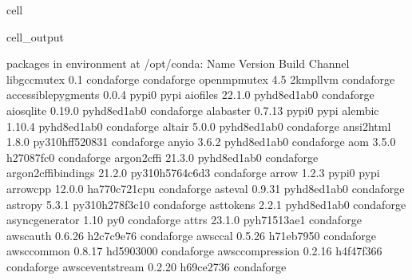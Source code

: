 \documentclass[letterpaper,table,10pt,english]{jupyterBook}
\begin{document}
\begin{sphinxuseclass}{cell}
\begin{sphinxVerbatimOutput}
\begin{sphinxuseclass}{cell_output}
\begin{sphinxVerbatim}[commandchars=\\\{\}]
\PYGZsh{} packages in environment at /opt/conda:
\PYGZsh{}
\PYGZsh{} Name                    Version                   Build  Channel
\PYGZus{}libgcc\PYGZus{}mutex             0.1                 conda\PYGZus{}forge    conda\PYGZhy{}forge
\PYGZus{}openmp\PYGZus{}mutex             4.5                  2\PYGZus{}kmp\PYGZus{}llvm    conda\PYGZhy{}forge
accessible\PYGZhy{}pygments       0.0.4                    pypi\PYGZus{}0    pypi
aiofiles                  22.1.0             pyhd8ed1ab\PYGZus{}0    conda\PYGZhy{}forge
aiosqlite                 0.19.0             pyhd8ed1ab\PYGZus{}0    conda\PYGZhy{}forge
alabaster                 0.7.13                   pypi\PYGZus{}0    pypi
alembic                   1.10.4             pyhd8ed1ab\PYGZus{}0    conda\PYGZhy{}forge
altair                    5.0.0              pyhd8ed1ab\PYGZus{}0    conda\PYGZhy{}forge
ansi2html                 1.8.0           py310hff52083\PYGZus{}1    conda\PYGZhy{}forge
anyio                     3.6.2              pyhd8ed1ab\PYGZus{}0    conda\PYGZhy{}forge
aom                       3.5.0                h27087fc\PYGZus{}0    conda\PYGZhy{}forge
argon2\PYGZhy{}cffi               21.3.0             pyhd8ed1ab\PYGZus{}0    conda\PYGZhy{}forge
argon2\PYGZhy{}cffi\PYGZhy{}bindings      21.2.0          py310h5764c6d\PYGZus{}3    conda\PYGZhy{}forge
arrow                     1.2.3                    pypi\PYGZus{}0    pypi
arrow\PYGZhy{}cpp                 12.0.0           ha770c72\PYGZus{}1\PYGZus{}cpu    conda\PYGZhy{}forge
asteval                   0.9.31             pyhd8ed1ab\PYGZus{}0    conda\PYGZhy{}forge
astropy                   5.3.1           py310h278f3c1\PYGZus{}0    conda\PYGZhy{}forge
asttokens                 2.2.1              pyhd8ed1ab\PYGZus{}0    conda\PYGZhy{}forge
async\PYGZus{}generator           1.10                       py\PYGZus{}0    conda\PYGZhy{}forge
attrs                     23.1.0             pyh71513ae\PYGZus{}1    conda\PYGZhy{}forge
aws\PYGZhy{}c\PYGZhy{}auth                0.6.26               h2c7c9e7\PYGZus{}6    conda\PYGZhy{}forge
aws\PYGZhy{}c\PYGZhy{}cal                 0.5.26               h71eb795\PYGZus{}0    conda\PYGZhy{}forge
aws\PYGZhy{}c\PYGZhy{}common              0.8.17               hd590300\PYGZus{}0    conda\PYGZhy{}forge
aws\PYGZhy{}c\PYGZhy{}compression         0.2.16               h4f47f36\PYGZus{}6    conda\PYGZhy{}forge
aws\PYGZhy{}c\PYGZhy{}event\PYGZhy{}stream        0.2.20               h69ce273\PYGZus{}6    conda\PYGZhy{}forge

\end{sphinxVerbatim}
\end{sphinxuseclass}
\end{sphinxVerbatimOutput}
\end{sphinxuseclass}
\end{document}
